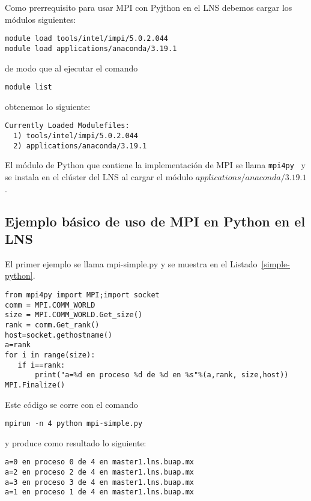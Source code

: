 \documentclass[letter]{jpconf}
\begin{document}
Como prerrequisito para usar MPI con Pyjthon en el LNS debemos cargar los m\'odulos siguientes:
\color{blue}
\begin{verbatim}
module load tools/intel/impi/5.0.2.044
module load applications/anaconda/3.19.1
\end{verbatim}
\color{black}
de modo que al ejecutar el comando
\color{blue}
\begin{verbatim}
module list
\end{verbatim}
\color{black}
obtenemos lo siguiente:
\color{brown}
\begin{verbatim}
Currently Loaded Modulefiles:
  1) tools/intel/impi/5.0.2.044     
  2) applications/anaconda/3.19.1
\end{verbatim}
\color{black}

El m\'odulo de Python que contiene la implementaci\'on de MPI se llama  \texttt{mpi4py}~\cite{mpi4py} y se instala en el cl\'uster del LNS al  cargar  el m\'odulo  $applications/anaconda/3.19.1$.

\subsection{Ejemplo b\'asico de uso de MPI en Python en el LNS}


El primer ejemplo se llama mpi-simple.py y se muestra en el  Listado~\ref{simple-python}.
\small
\begin{lstlisting}[float,floatplacement=H,label=simple-python,caption=Listado del programa  \texttt{mpi-simple.py} en Python]
from mpi4py import MPI;import socket
comm = MPI.COMM_WORLD
size = MPI.COMM_WORLD.Get_size()
rank = comm.Get_rank()
host=socket.gethostname()
a=rank
for i in range(size):
   if i==rank:
       print("a=%d en proceso %d de %d en %s"%(a,rank, size,host))
MPI.Finalize()
\end{lstlisting}


Este c\'odigo se corre con el comando
\color{blue}
\begin{verbatim}
mpirun -n 4 python mpi-simple.py
\end{verbatim}
\color{black}
y produce como resultado lo siguiente:
\color{brown}
\begin{verbatim}
a=0 en proceso 0 de 4 en master1.lns.buap.mx
a=2 en proceso 2 de 4 en master1.lns.buap.mx
a=3 en proceso 3 de 4 en master1.lns.buap.mx
a=1 en proceso 1 de 4 en master1.lns.buap.mx
\end{verbatim}
\color{black}
\end{document}
